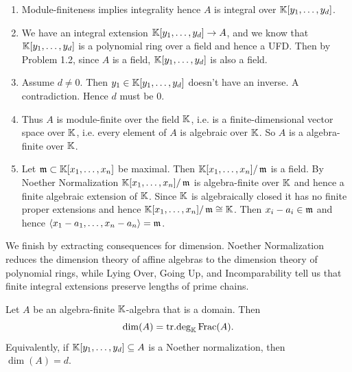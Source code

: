 \documentclass[Notebook.tex]{subfiles}
\begin{document}
\begin{solution}
    \bbni
    \begin{enumerate}
        \item Module-finiteness implies integrality hence $A$ is integral over $\mathbb K[y_1, \ldots, y_d]$. 
        \item We have an integral extension $\mathbb K[y_1, \ldots, y_d] \to A$, and we know that $\mathbb K[y_1, \ldots, y_d]$ is a polynomial ring over a field and hence a UFD. Then by Problem 1.2, since $A$ is a field, $\mathbb K[y_1, \ldots, y_d]$ is also a field. 
        
        \item Assume $d \neq 0$. Then $y_1 \in \mathbb K[y_1, \ldots, y_d]$ doesn't have an inverse. A contradiction. Hence $d$ must be $0$. 
        
        \item Thus $A$ is module-finite over the field $\mathbb K$, i.e. is a finite-dimensional vector space over $\mathbb K$, i.e. every element of $A$ is algebraic over $\mathbb K$. So $A$ is a algebra-finite over $\mathbb K$. 
        
        \item Let $\operatorname{\mathfrak{m}} \subset \mathbb K[x_1, \ldots, x_n]$ be maximal. Then $\mathbb K[x_1, \ldots, x_n]/\operatorname{\mathfrak{m}}$ is a field. By Noether Normalization $\mathbb K[x_1, \ldots, x_n]/\operatorname{\mathfrak{m}}$ is algebra-finite over $\mathbb K$ and hence a finite algebraic extension of $\mathbb K$. Since $\mathbb K$ is algebraically closed it has no finite proper extensions and hence $\mathbb K[x_1, \ldots, x_n]/\operatorname{\mathfrak{m}} \cong \mathbb K$. Then $x_i - a_i \in \operatorname{\mathfrak{m}}$ and hence $\langle x_1 - a_1, \ldots, x_n - a_n \rangle = \operatorname{\mathfrak{m}}$. 
    \end{enumerate}
\end{solution}

\newpage 

\hrulefill

We finish by extracting consequences for dimension. Noether Normalization reduces the dimension theory of affine algebras to the dimension theory of polynomial rings, while Lying Over, Going Up, and Incomparability tell us that finite integral extensions preserve lengths of prime chains.

\begin{theorem}
Let $A$ be an algebra-finite $\mathbb K$-algebra that is a domain. Then
\[
\dim(A)=\operatorname{\text{tr.deg}}_{\mathbb K}\text{Frac}(A).
\]
Equivalently, if $\mathbb K[y_1,\ldots,y_d]\subseteq A$ is a Noether normalization, then $\dim(A)=d$.
\end{theorem}

\hrulefill
\end{document}
